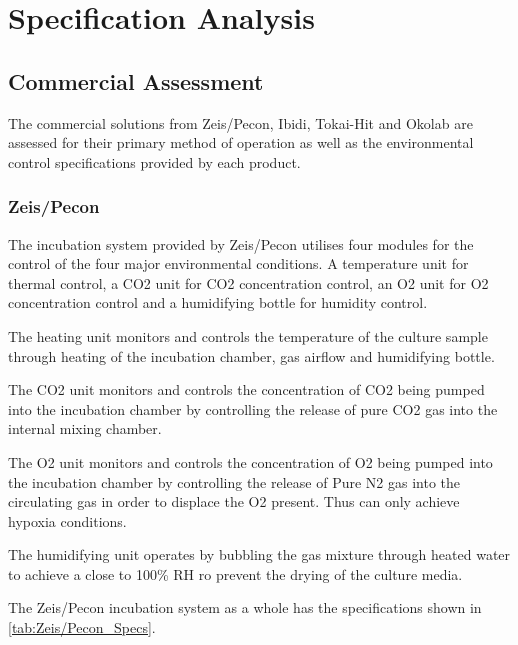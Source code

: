 \documentclass[class=report,11pt,crop=false]{standalone}
\begin{document}
\chapter{Specification Analysis} \label{ch:FeasibAnalysis}
\vspace{-1cm}
\section{Commercial Assessment}
The commercial solutions from Zeis/Pecon, Ibidi, Tokai-Hit and Okolab are assessed for their primary method of operation as well as the environmental control specifications provided by each product.

\subsection{Zeis/Pecon}
The incubation system provided by Zeis/Pecon utilises four modules for the control of the four major environmental conditions. A temperature unit for thermal control, a CO2 unit for CO2 concentration control, an O2 unit for O2 concentration control and a humidifying bottle for humidity control.

The heating unit monitors and controls the temperature of the culture sample through heating of the incubation chamber, gas airflow and humidifying bottle.

The CO2 unit monitors and controls the concentration of CO2 being pumped into the incubation chamber by controlling the release of pure CO2 gas into the internal mixing chamber.

The O2 unit monitors and controls the concentration of O2 being pumped into the incubation chamber by controlling the release of Pure N2 gas into the circulating gas in order to displace the O2 present. Thus can only achieve hypoxia conditions.

The humidifying unit operates by bubbling the gas mixture through heated water to achieve a close to 100\% RH ro prevent the drying of the culture media.

The Zeis/Pecon incubation system as a whole has the specifications shown in \autoref{tab:Zeis/Pecon_Specs}.
\end{document}
